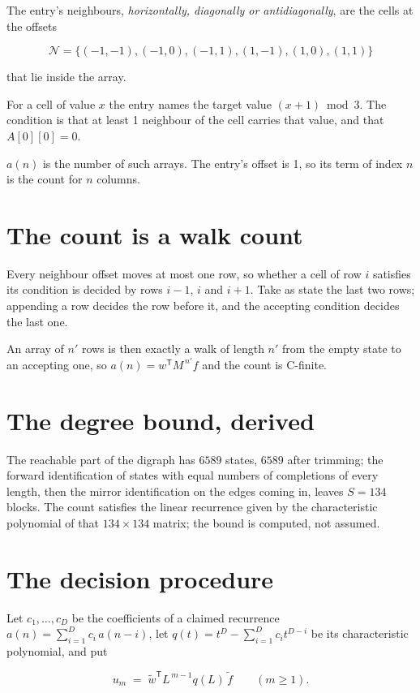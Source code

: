 \documentclass[11pt]{article}
\theoremstyle{definition}
\begin{document}
The entry's neighbours, {\itshape horizontally, diagonally or antidiagonally}, are the cells at the offsets

\[\mathcal{N} = \{(-1,-1), (-1,0), (-1,1), (1,-1), (1,0), (1,1)\}\]

that lie inside the array.

For a cell of value $x$ the entry names the target value $(x + 1) \bmod 3$. The condition is that at least 1 neighbour of the cell carries that value, and that $A[0][0] = 0$.

$a(n)$ is the number of such arrays. The entry's offset is 1, so its term of index $n$ is the count for $n$ columns.

\section{The count is a walk count}

Every neighbour offset moves at most one row, so whether a cell of row $i$ satisfies its condition is decided by rows $i-1$, $i$ and $i+1$. Take as state the last two rows; appending a row decides the row before it, and the accepting condition decides the last one.

An array of $n'$ rows is then exactly a walk of length $n'$ from the empty state to an accepting one, so $a(n) = w^{\mathsf T}M^{\,n'}f$ and the count is C-finite.

\section{The degree bound, derived}

The reachable part of the digraph has $6589$ states, $6589$ after trimming; the forward identification of states with equal numbers of completions of every length, then the mirror identification on the edges coming in, leaves $S = 134$ blocks. The count satisfies the linear recurrence given by the characteristic polynomial of that $134\times134$ matrix; the bound is computed, not assumed.

\section{The decision procedure}

Let $c_1,\dots,c_D$ be the coefficients of a claimed recurrence $a(n) = \sum_{i=1}^{D} c_i\,a(n-i)$, let $q(t) = t^{D} - \sum_{i=1}^{D} c_i t^{D-i}$ be its characteristic polynomial, and put

\[u_m \;=\; \tilde w^{\mathsf T} L^{\,m-1} q(L)\,\tilde f \qquad (m \ge 1).\]
\end{document}
